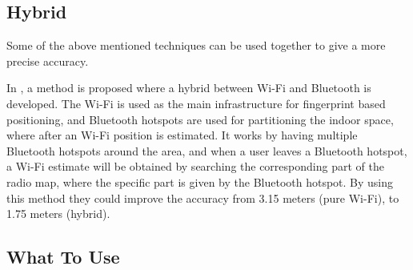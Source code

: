 \subsection{Hybrid}

Some of the above mentioned techniques can be used together to give a more precise accuracy. 

In \cite{aauhybrid}, a method is proposed where a hybrid between Wi-Fi and Bluetooth is developed. The Wi-Fi is used as the main infrastructure for fingerprint based positioning, and Bluetooth hotspots are used for partitioning the indoor space, where after an Wi-Fi position is estimated. It works by having multiple Bluetooth hotspots around the area, and when a user leaves a Bluetooth hotspot, a Wi-Fi estimate will be obtained by searching the corresponding part of the radio map, where the specific part is given by the Bluetooth hotspot. By using this method they could improve the accuracy from 3.15 meters (pure Wi-Fi), to 1.75 meters (hybrid). 




\subsection{What To Use} 



